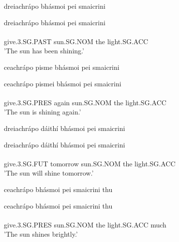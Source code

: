 \documentclass{article}
\begin{document}
\begin{exe}
\ex \begin{ogham} dreiachrápo bhásmoi pei smaicrini \end{ogham}
\glll dreiachrápo bhásmoi pei smaicrini\\
   \\
give.3.SG.PAST sun.SG.NOM the light.SG.ACC\\
\trans 'The sun has been shining.'
\end{exe}
\begin{exe}
\ex \begin{ogham} ceachrápo pisme bhásmoi pei smaicrini \end{ogham}
\glll ceachrápo pismei bhásmoi pei smaicrini\\
    \\
give.3.SG.PRES again sun.SG.NOM the light.SG.ACC\\
\trans 'The sun is shining again.'
\end{exe}
\begin{exe}
\ex \begin{ogham} dreiachrápo dáithí bhásmoi pei smaicrini \end{ogham}
\glll dreiachrápo dáithí bhásmoi pei smaicrini\\
    \\
give.3.SG.FUT tomorrow sun.SG.NOM the light.SG.ACC\\
\trans 'The sun will shine tomorrow.'
\end{exe}
\begin{exe}
\ex \begin{ogham} ceachrápo bhásmoi pei smaicrini thu \end{ogham}
\glll ceachrápo bhásmoi pei smaicrini thu\\
    \\
give.3.SG.PRES sun.SG.NOM the light.SG.ACC much\\
\trans 'The sun shines brightly.'
\end{exe}
\end{document}
